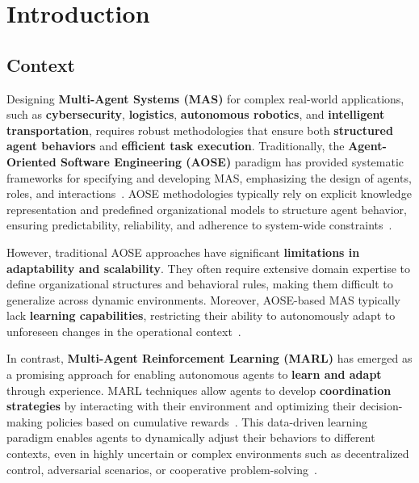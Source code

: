 \documentclass[pdflatex,sn-mathphys-num]{sn-jnl}%
\theoremstyle{thmstyleone}%
\theoremstyle{thmstyletwo}%
\theoremstyle{thmstylethree}%
\begin{document}




\maketitle

\section{Introduction}

\subsection{Context}

Designing \textbf{Multi-Agent Systems (MAS)} for complex real-world applications, such as \textbf{cybersecurity}, \textbf{logistics}, \textbf{autonomous robotics}, and \textbf{intelligent transportation}, requires robust methodologies that ensure both \textbf{structured agent behaviors} and \textbf{efficient task execution}. Traditionally, the \textbf{Agent-Oriented Software Engineering (AOSE)} paradigm has provided systematic frameworks for specifying and developing MAS, emphasizing the design of agents, roles, and interactions~\cite{Pavon2003, Bernon2005}. AOSE methodologies typically rely on explicit knowledge representation and predefined organizational models to structure agent behavior, ensuring predictability, reliability, and adherence to system-wide constraints~\cite{Hindriks2014}.

However, traditional AOSE approaches have significant \textbf{limitations in adaptability and scalability}. They often require extensive domain expertise to define organizational structures and behavioral rules, making them difficult to generalize across dynamic environments. Moreover, AOSE-based MAS typically lack \textbf{learning capabilities}, restricting their ability to autonomously adapt to unforeseen changes in the operational context~\cite{Garcia2004}.

In contrast, \textbf{Multi-Agent Reinforcement Learning (MARL)} has emerged as a promising approach for enabling autonomous agents to \textbf{learn and adapt} through experience. MARL techniques allow agents to develop \textbf{coordination strategies} by interacting with their environment and optimizing their decision-making policies based on cumulative rewards~\cite{Zhang2021}. This data-driven learning paradigm enables agents to dynamically adjust their behaviors to different contexts, even in highly uncertain or complex environments such as decentralized control, adversarial scenarios, or cooperative problem-solving~\cite{Papoudakis2021}.
\end{document}
